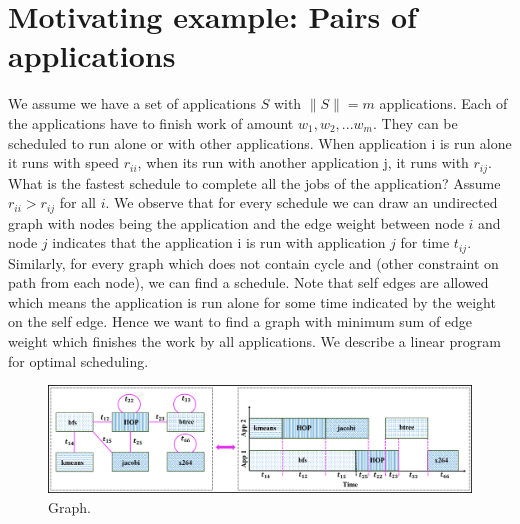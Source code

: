\section{Motivating example: Pairs of applications}
\label{sec:motivation}
We assume we have a set of applications $S$ with $\|S\| = m$ applications. Each of the applications have to finish work of amount $w_1, w_2,. . . w_m$. They can be scheduled to run alone or with other applications. When application i is run alone it runs with speed $r_{ii}$, when its run with another application j, it runs with $r_{ij}$. What is the fastest schedule to complete all the jobs of the application? Assume $r_{ii} > r_{ij}$ for all $i$. We observe that for every schedule we can draw an undirected graph with nodes being the application and the edge weight between node $i$ and node $j$ indicates that the application i is run with application $j$ for time $t_{ij}$. Similarly, for every graph which does  not contain cycle and (other constraint on path from each node), we can find a schedule. Note that self edges are allowed which means the application is run alone for some time indicated by the weight on the self edge. Hence we want to find a graph with minimum sum of edge weight which finishes the work by all applications. We describe a linear program for optimal scheduling.

\begin{figure}[htp!]
\begin{center}
 \includegraphics[width=1\textwidth]{figures/PairGraphSchedulebp.png}
  \caption{  Graph.}
\label{fig:simulation}
\end{center}
\end{figure}


